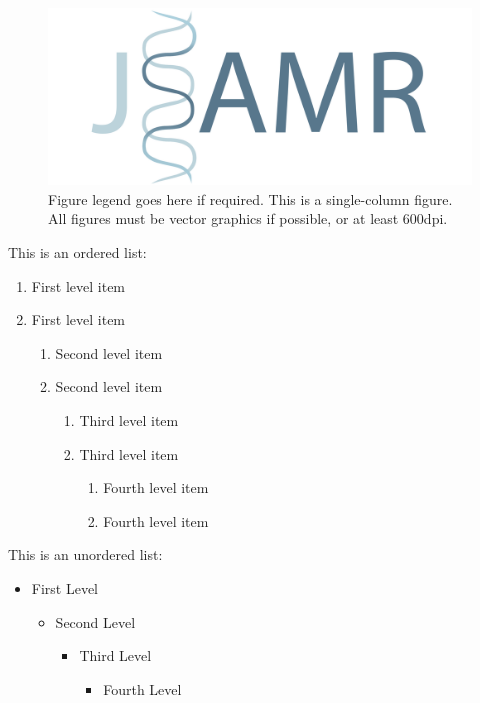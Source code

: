 \documentclass[paper=a4,fontsize=11pt,twocolumn]{article}
\begin{document}
\begin{figure}
\centering
\includegraphics[width=\columnwidth]{logo-wide-jsamr.pdf}
\caption{Figure legend goes here if required. This is a single-column figure. All figures must be vector graphics if possible, or at least 600dpi.}
\label{fig:one-column}
\end{figure}
This is an ordered list:
\begin{enumerate}
   \item First level item
   \item First level item
   \begin{enumerate}
     \item Second level item
     \item Second level item
     \begin{enumerate}
       \item Third level item
       \item Third level item
       \begin{enumerate}
         \item Fourth level item
         \item Fourth level item
       \end{enumerate}
     \end{enumerate}
   \end{enumerate}
 \end{enumerate}

This is an unordered list:
 \begin{itemize}
   \item  First Level
   \begin{itemize}
     \item  Second Level
     \begin{itemize}
       \item  Third Level
       \begin{itemize}
         \item  Fourth Level
       \end{itemize}
     \end{itemize}
   \end{itemize}
 \end{itemize}
\end{document}
